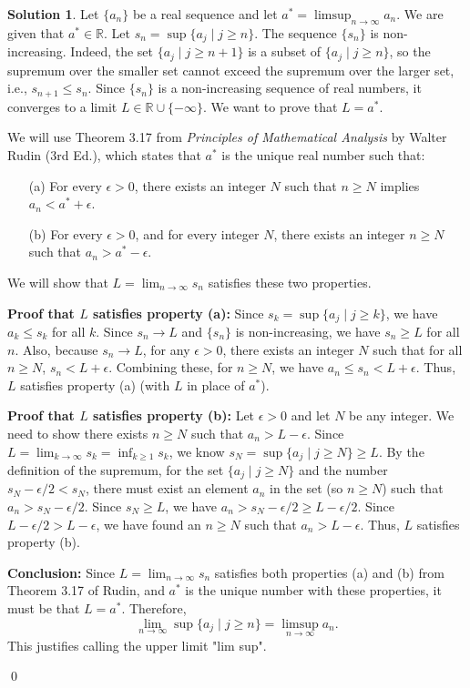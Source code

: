\documentclass[12pt,oneside]{article}
\theoremstyle{definition}
\newtheorem*{solution}{Solution} %
\newcommand{\rudin}{\textit{Principles of Mathematical Analysis} by Walter Rudin (3rd Ed.)}
\begin{document}
\begin{solution}
Let $\{a_n\}$ be a real sequence and let $a^* = \limsup_{n\rightarrow \infty}a_n$. We are given that $a^* \in \mathbb{R}$.
Let $s_n = \sup\{a_j \mid j \ge n\}$.
The sequence $\{s_n\}$ is non-increasing. Indeed, the set $\{a_j \mid j \ge n+1\}$ is a subset of $\{a_j \mid j \ge n\}$, so the supremum over the smaller set cannot exceed the supremum over the larger set, i.e., $s_{n+1} \le s_n$.
Since $\{s_n\}$ is a non-increasing sequence of real numbers, it converges to a limit $L \in \mathbb{R} \cup \{-\infty\}$. We want to prove that $L = a^*$.

We will use Theorem 3.17 from \rudin{}, which states that $a^*$ is the unique real number such that:
\begin{itemize}
    \item[(a)] For every $\epsilon > 0$, there exists an integer $N$ such that $n \geq N$ implies $a_n < a^* + \epsilon$.
    \item[(b)] For every $\epsilon > 0$, and for every integer $N$, there exists an integer $n \geq N$ such that $a_n > a^* - \epsilon$.
\end{itemize}
We will show that $L = \lim_{n\to\infty} s_n$ satisfies these two properties.

\textbf{Proof that $L$ satisfies property (a):}
Since $s_k = \sup\{a_j \mid j \ge k\}$, we have $a_k \le s_k$ for all $k$.
Since $s_n \to L$ and $\{s_n\}$ is non-increasing, we have $s_n \ge L$ for all $n$.
Also, because $s_n \to L$, for any $\epsilon > 0$, there exists an integer $N$ such that for all $n \ge N$, $s_n < L + \epsilon$.
Combining these, for $n \ge N$, we have $a_n \le s_n < L + \epsilon$.
Thus, $L$ satisfies property (a) (with $L$ in place of $a^*$).

\textbf{Proof that $L$ satisfies property (b):}
Let $\epsilon > 0$ and let $N$ be any integer. We need to show there exists $n \ge N$ such that $a_n > L - \epsilon$.
Since $L = \lim_{k\to\infty} s_k = \inf_{k\ge 1} s_k$, we know $s_N = \sup\{a_j \mid j \ge N\} \ge L$.
By the definition of the supremum, for the set $\{a_j \mid j \ge N\}$ and the number $s_N - \epsilon/2 < s_N$, there must exist an element $a_n$ in the set (so $n \ge N$) such that $a_n > s_N - \epsilon/2$.
Since $s_N \ge L$, we have $a_n > s_N - \epsilon/2 \ge L - \epsilon/2$.
Since $L - \epsilon/2 > L - \epsilon$, we have found an $n \ge N$ such that $a_n > L - \epsilon$.
Thus, $L$ satisfies property (b).

\textbf{Conclusion:}
Since $L = \lim_{n\to\infty} s_n$ satisfies both properties (a) and (b) from Theorem 3.17 of Rudin, and $a^*$ is the unique number with these properties, it must be that $L = a^*$.
Therefore,
\[
\lim_{n\rightarrow \infty} \sup\{a_j\;\vert\; j\geq n\} = 
\limsup_{n\rightarrow \infty}a_n. 
\]
This justifies calling the upper limit "lim sup".
\end{solution}
\qed
\end{document}
